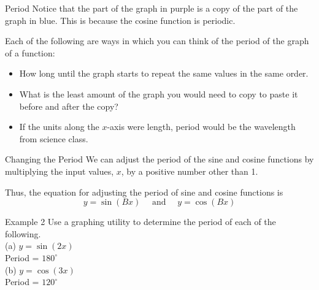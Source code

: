 \documentclass[t,usenames,dvipsnames]{beamer}
\begin{document}
\begin{frame}{Period}
Notice that the part of the graph in purple is a copy of the part of the graph in blue. This is because the cosine function is \alert{periodic}.   \newline\\   \pause

Each of the following are ways in which you can think of the period of the graph of a function:   \pause  \newline\\
\begin{itemize}
    \item How long until the graph starts to repeat the same values in the same order.  \pause  \newline\\
    \item What is the least amount of the graph you would need to copy to paste it before and after the copy?   \pause  \newline\\
    \item If the units along the $x$-axis were length, period would be the wavelength from science class.
\end{itemize}
\end{frame}

\begin{frame}{Changing the Period}
We can adjust the period of the sine and cosine functions by multiplying the input values, $x$, by a positive number other than 1. \newline\\    \pause

Thus, the equation for adjusting the period of sine and cosine functions is
\[
y = \sin (Bx) \quad \text{ and } \quad y = \cos (Bx)
\]
\end{frame}

\begin{frame}{Example 2}
Use a graphing utility to determine the period of each of the following.   \newline\\  
(a) \quad $y = \sin(2x)$    \newline\\ \pause
Period = $180^\circ$    \newline\\  \pause
(b) \quad $y = \cos(3x)$    \newline\\ \pause
Period = $120^\circ$
\end{frame}
\end{document}
